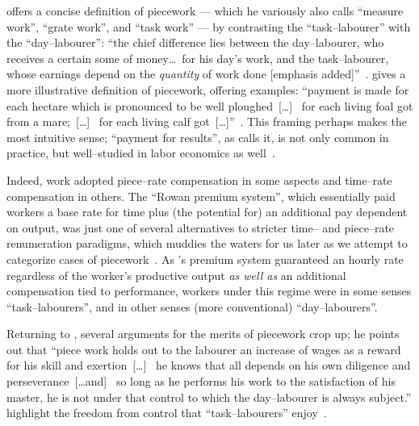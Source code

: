 \documentclass[trackingWork]{subfiles}
\begin{document}
\citeauthor{hughRaynbirdTaskWork} offers
a concise definition of piecework
--- which he variously also calls ``measure work'', ``grate work'', and ``task work'' ---
by contrasting the ``task--labourer'' with the ``day--labourer'':
``the chief difference lies between the day--labourer,
who receives a certain some of money\dots~for his day's work,
and the task--labourer, whose earnings depend on the \textit{quantity} of work done [emphasis added]''~\cite{hughRaynbirdTaskWork}.
\citeauthor{10.2307/2338394} gives a more illustrative definition of piecework,
offering examples:
``payment is made for each hectare which is pronounced to be well ploughed~[\dots]~
for each living foal got from a mare;~[\dots]~
for each living calf got~[\dots]''~\cite{10.2307/2338394}.
This framing perhaps makes the most intuitive sense;
``payment for results'', as \citeauthor{10.2307/2338394} calls it,
is not only common in practice, but well--studied in labor economics as well~\cite{Figlio2007901,weitzman1976new,10.2307/3003414,BJIR:BJIR038}.

Indeed, work adopted piece--rate compensation in some aspects and
time--rate compensation in others.
The ``Rowan premium system'',
which essentially paid workers
a base rate for time plus
(the potential for) an additional pay dependent on output,
was just one of several alternatives to stricter time-- and piece--rate renumeration paradigms, which
muddies the waters for us later as we attempt to categorize cases of piecework~\cite{rowan1901premium}.
As \citeauthor{rowan1901premium}'s premium system guaranteed an hourly rate
regardless of the worker's productive output
\textit{as well as} an additional compensation tied to performance,
workers under this regime were in some senses ``task--labourers'',
and in other senses
(more conventional)
``day--labourers''.

Returning to
\citeauthor{hughRaynbirdTaskWork}, several arguments for the merits of piecework
crop up; he points out that 
``piece work holds out to the labourer an increase of wages as a reward for his skill and exertion~[\dots]~
he knows that all depends on his own diligence and perseverance~[\dots and]~
so long as he performs his work to the satisfaction of his master,
he is not under that control to which the day--labourer is always subject.''
\citeauthor{hughRaynbirdTaskWork} highlight the freedom from control that ``task--labourers'' enjoy~\cite{hughRaynbirdTaskWork,rowan1901premium}.
\end{document}
